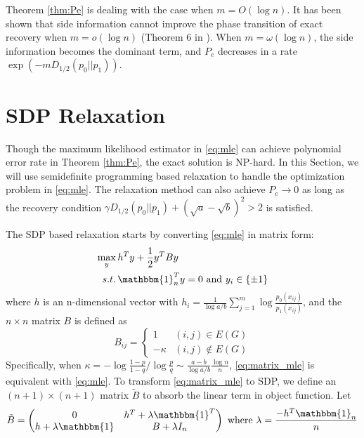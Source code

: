 \documentclass[conference]{IEEEtran}
\begin{document}
	Theorem \ref{thm:Pe} is dealing with the case when $m=O(\log n)$. It has been shown
	that side information cannot improve the phase transition of exact recovery when $m=o(\log n)$ (Theorem 6 in \cite{saad2018community}). When $m=\omega(\log n)$,
	the side information becomes the dominant term, and $P_e$ decreases in a rate $\exp(-m D_{1/2}(p_0||p_1) )$.
	
	\section{SDP Relaxation}
	Though the maximum likelihood estimator in \eqref{eq:mle} can achieve polynomial
	error rate in Theorem \ref{thm:Pe}, the exact solution is NP-hard. In this
	Section, we will use semidefinite programming based relaxation to handle
	the optimization problem in \eqref{eq:mle}. The relaxation method
	can also achieve $P_e\to 0$ as long as the recovery condition
	$\gamma D_{1/2}(p_0||p_1) + (\sqrt{a} - \sqrt{b})^2 > 2$ is satisfied.
	
	The SDP based relaxation starts by converting \eqref{eq:mle} in matrix form:
	\begin{align}
	\max_{y}\, & h^T y + \frac{1}{2}y^T B y \notag \\
	s.t.\, & \mathbbm{1}_n^T y = 0 \text{ and } y_i \in \{\pm 1 \} \label{eq:matrix_mle}
	\end{align}
	where $h$ is an n-dimensional vector with $h_i = \frac{1}{\log a/b}\sum_{j=1}^m \log \frac{p_0(x_{ij})}{p_1(x_{ij})}$, and the $n\times n $ matrix $B$ is defined as
	\begin{equation}
	B_{ij} = \begin{cases}
	1 & (i,j)\in E(G) \\
	-\kappa & (i,j) \not\in E(G)
	\end{cases}
	\end{equation}
	Specifically, when $\kappa = -\log\frac{1-p}{1-q} / \log\frac{p}{q} \sim \frac{a-b}{\log a/b}\frac{\log n}{n}$, \eqref{eq:matrix_mle} is equivalent with \eqref{eq:mle}. 
	To transform \eqref{eq:matrix_mle} to SDP, we define an $(n+1) \times (n+1)$ matrix $\widetilde{B}$
	to absorb the linear term in object function.
	Let 
	\begin{equation}
	\tilde{B} = \begin{pmatrix} 0 & h^T + \lambda \mathbbm{1}^T \\ h + \lambda \mathbbm{1} & B + \lambda I_n \end{pmatrix}
	\textrm{ where } \lambda = \frac{-h^T \mathbbm{1}_n}{n} 
	\end{equation}
	
\end{document}
